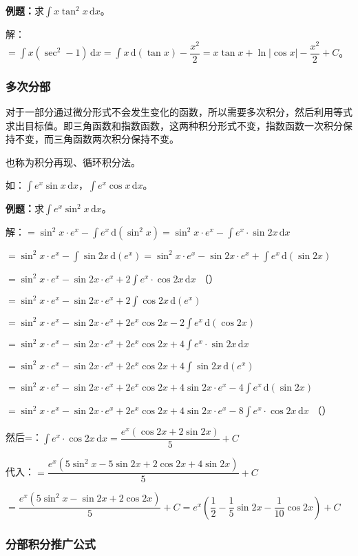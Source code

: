 \documentclass[UTF8, 12pt]{ctexart}
\begin{document}
\textbf{例题：}求$\int x\tan^2x\,\textrm{d}x$。

解：$=\int x(\sec^2-1)\,\textrm{d}x=\int x\,\textrm{d}(\tan x)-\dfrac{x^2}{2}=x\tan x+\ln\vert\cos x\vert-\dfrac{x^2}{2}+C$。

\subsubsection{多次分部}

对于一部分通过微分形式不会发生变化的函数，所以需要多次积分，然后利用等式求出目标值。即三角函数和指数函数，这两种积分形式不变，指数函数一次积分保持不变，而三角函数两次积分保持不变。

也称为积分再现、循环积分法。

如：$\int e^x\sin x\,\textrm{d}x$，$\int e^x\cos x\,\textrm{d}x$。

\textbf{例题：}求$\int e^x\sin^2x\,\textrm{d}x$。

解：$=\sin^2x\cdot e^x-\int e^x\,\textrm{d}(\sin^2x)=\sin^2x\cdot e^x-\int e^x\cdot\sin 2x\,\textrm{d}x$

$=\sin^2x\cdot e^x-\int\sin2x\,\textrm{d}(e^x)=\sin^2x\cdot e^x-\sin2x\cdot e^x+\int e^x\,\textrm{d}(\sin2x)$

$=\sin^2x\cdot e^x-\sin2x\cdot e^x+2\int e^x\cdot\cos2x\,\textrm{d}x$ （）

$=\sin^2x\cdot e^x-\sin2x\cdot e^x+2\int\cos2x\,\textrm{d}(e^x)$

$=\sin^2x\cdot e^x-\sin2x\cdot e^x+2e^x\cos2x-2\int e^x\,\textrm{d}(\cos2x)$

$=\sin^2x\cdot e^x-\sin2x\cdot e^x+2e^x\cos2x+4\int e^x\cdot\sin2x\,\textrm{d}x$

$=\sin^2x\cdot e^x-\sin2x\cdot e^x+2e^x\cos2x+4\int\sin2x\,\textrm{d}(e^x)$

$=\sin^2x\cdot e^x-\sin2x\cdot e^x+2e^x\cos2x+4\sin2x\cdot e^x-4\int e^x\,\textrm{d}(\sin2x)$

$=\sin^2x\cdot e^x-\sin2x\cdot e^x+2e^x\cos2x+4\sin2x\cdot e^x-8\int e^x\cdot\cos2x\,\textrm{d}x$ （）

然后=：$\int e^x\cdot\cos2x\,\textrm{d}x=\dfrac{e^x(\cos2x+2\sin2x)}{5}+C$

代入：$=\dfrac{e^x(5\sin^2x-5\sin2x+2\cos2x+4\sin2x)}{5}+C$

$=\dfrac{e^x(5\sin^2x-\sin2x+2\cos2x)}{5}+C=e^x\left(\dfrac{1}{2}-\dfrac{1}{5}\sin2x-\dfrac{1}{10}\cos2x\right)+C$

\subsubsection{分部积分推广公式}
\end{document}
